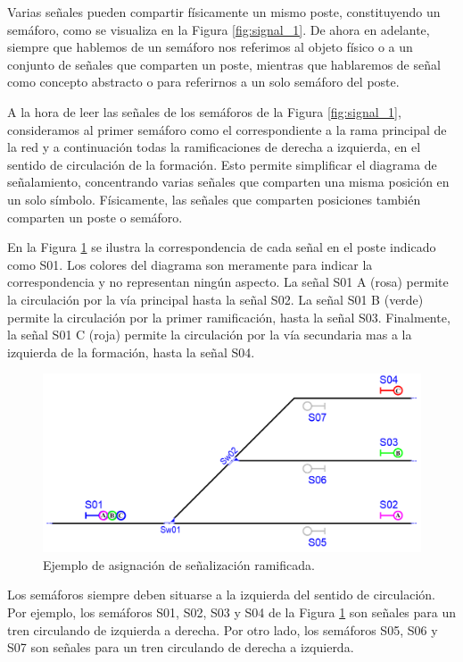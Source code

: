     Varias señales pueden compartir físicamente un mismo poste, constituyendo un semáforo, como se visualiza en la Figura \ref{fig:signal_1}. De ahora en adelante, siempre que hablemos de un semáforo nos referimos al objeto físico o a un conjunto de señales que comparten un poste, mientras que hablaremos de señal como concepto abstracto o para referirnos a un solo semáforo del poste.
    
    A la hora de leer las señales de los semáforos de la Figura \ref{fig:signal_1}, consideramos al primer semáforo como el correspondiente a la rama principal de la red y a continuación todas la ramificaciones de derecha a izquierda, en el sentido de circulación de la formación. Esto permite simplificar el diagrama de señalamiento, concentrando varias señales que comparten una misma posición en un solo símbolo. Físicamente, las señales que comparten posiciones también comparten un poste o semáforo.

    En la Figura \ref{fig:signal_2} se ilustra la correspondencia de cada señal en el poste indicado como S01. Los colores del diagrama son meramente para indicar la correspondencia y no representan ningún aspecto. La señal S01 A (rosa)  permite la circulación por la vía principal hasta la señal S02. La señal S01 B (verde) permite la circulación por la primer ramificación, hasta la señal S03. Finalmente, la señal S01 C (roja) permite la circulación por la vía secundaria mas a la izquierda de la formación, hasta la señal S04.

    \begin{figure}[H]
        \centering
        \includegraphics[width=1\textwidth]{Figuras/semaforos.PNG}
        \centering\caption{Ejemplo de asignación de señalización ramificada.}
        \label{fig:signal_2}
    \end{figure}

    Los semáforos siempre deben situarse a la izquierda del sentido de circulación. Por ejemplo, los semáforos S01, S02, S03 y S04 de la Figura \ref{fig:signal_2} son señales para un tren circulando de izquierda a derecha. Por otro lado, los semáforos S05, S06 y S07 son señales para un tren circulando de derecha a izquierda.